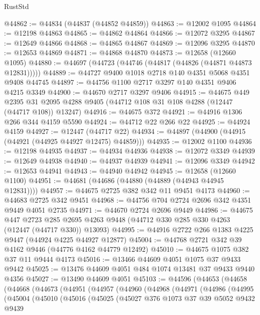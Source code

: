 \begin{lexlean}{RustStd}
\begin{coremodule}
@44862 := @44834 (@44837 (@44852 @44859))
@44863 := @12002 @1095
@44864 := @12198 @44863
@44865 := @44862 @44864
@44866 := @12072 @3295
@44867 := @12649 @44866
@44868 := @44865 @44867
@44869 := @12096 @3295
@44870 := @12653 @44869
@44871 := @44868 @44870
@44873 := @12658 (@12660 @1095)
@44880 := @44697 (@44723 (@44746 (@44817 (@44826 (@44871 @44873 @12831)))))
@44889 := @44727 @9400 @1018 @2718 @140 @4351 @5068 @4351 @9408 @44745
@44897 := @44756 @1100 @2717 @3297 @140 @4351 @9406 @4215 @3349
@44900 := @44670 @2717 @3297 @9406
@44915 := @44675
    @449
    @2395
    @31
    @2095
    @4288
    @9405
    (@44712 @108 @31 @108 @4288 (@12447 (@44717 @108)) @13247)
@44916 := @44675 @372
@44921 := @44916 @1306 @266 @344 @4159 @5590
@44924 := @44712 @22 @266 @22
@44925 := @44924 @4159
@44927 := @12447 (@44717 @22)
@44934 := @44897 (@44900 (@44915 (@44921 (@44925 @44927 @12475) @44859)))
@44935 := @12002 @1100
@44936 := @12198 @44935
@44937 := @44934 @44936
@44938 := @12072 @3349
@44939 := @12649 @44938
@44940 := @44937 @44939
@44941 := @12096 @3349
@44942 := @12653 @44941
@44943 := @44940 @44942
@44945 := @12658 (@12660 @1100)
@44951 := @44681 (@44686 (@44880 (@44889 (@44943 @44945 @12831))))
@44957 := @44675 @2725 @382 @342 @11 @9451 @4173
@44960 := @44683 @2725 @342 @9451
@44968 := @44756 @704 @2724 @2696 @342 @4351 @9449 @4051 @2735
@44971 := @44670 @2724 @2696 @9449
@44986 := @44675
    @447
    @2723
    @285
    @2695
    @4263
    @9448
    (@44712 @330 @285 @330 @4263 (@12447 (@44717 @330)) @13093)
@44995 := @44916 @2722 @266 @1383 @4225 @9447 (@44924 @4225 @44927 @12877)
@45004 := @44768 @2721 @342 @39 @4162 @9446 (@44776 @4162 @44779 @12492)
@45010 := @44675 @1075 @382 @37 @11 @9444 @4173
@45016 := @13466 @44609 @4051 @1075 @37 @9433 @9442
@45025 := @13476 @44609 @4051 @484 @1074 @13481 @37 @9433 @9440 @4356
@45027 := @13490 @44609 @4051
@45103 := @44596
    (@44653
      (@44658
        (@44668
          (@44673
            (@44951
              (@44957
                (@44960
                  (@44968
                    (@44971
                      (@44986
                        (@44995
                          (@45004
                            (@45010
                              (@45016
                                (@45025
                                  (@45027
                                    @376
                                    @1073
                                    @37
                                    @39
                                    @5052
                                    @9432
                                    @9439

\end{coremodule}
\end{lexlean}
